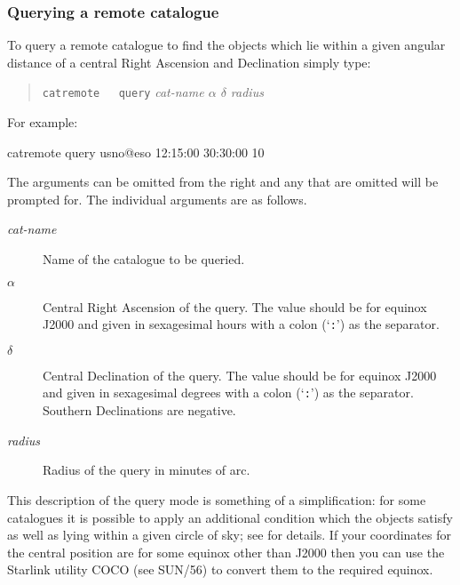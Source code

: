 \documentclass[twoside,11pt]{starlink}
\begin{document}
\subsubsection{Querying a remote catalogue}

To query a remote catalogue to find the objects which lie within a given
angular distance of a central Right Ascension and Declination simply type:


\begin{verse}
\texttt{catremote ~ query} \textit{cat-name $\alpha$ $\delta$ radius}
\end{verse}

For example:

\begin{terminalv}
catremote query usno@eso  12:15:00  30:30:00  10
\end{terminalv}

The arguments can be omitted from the right and any that are omitted will
be prompted for.  The individual arguments are as follows.

\begin{description}

  \item[\textit{cat-name}\/] Name of the catalogue to be queried.

  \item[$\alpha$\/] Central Right Ascension of the query.  The value
   should be for equinox J2000 and given in sexagesimal hours with a colon
   (`\texttt{:}') as the separator.

  \item[$\delta$\/] Central Declination of the query.  The value should be
   for equinox J2000 and given in sexagesimal degrees with a colon (`\texttt{:}')
   as the separator.  Southern Declinations are negative.

  \item[\textit{radius}\/] Radius of the query in minutes of arc.

\end{description}

This description of the query mode is something of a simplification: for
some catalogues it is possible to apply an additional condition which
the objects satisfy as well as lying within a given circle of sky; see
\cite{SSN76} for details.  If your coordinates for
the central position are for some equinox other than J2000 then you can use
the Starlink utility COCO (see SUN/56\cite{SUN56}) to convert them to the
required equinox.
\end{document}
